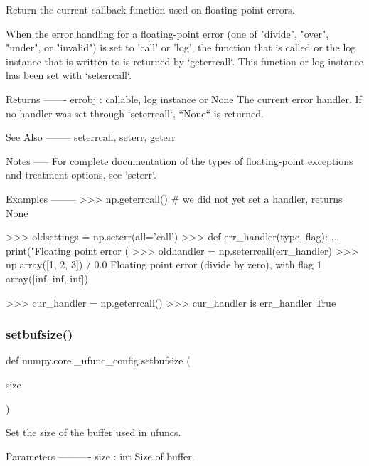 \begin{DoxyVerb}Return the current callback function used on floating-point errors.

When the error handling for a floating-point error (one of "divide",
"over", "under", or "invalid") is set to 'call' or 'log', the function
that is called or the log instance that is written to is returned by
`geterrcall`. This function or log instance has been set with
`seterrcall`.

Returns
-------
errobj : callable, log instance or None
    The current error handler. If no handler was set through `seterrcall`,
    ``None`` is returned.

See Also
--------
seterrcall, seterr, geterr

Notes
-----
For complete documentation of the types of floating-point exceptions and
treatment options, see `seterr`.

Examples
--------
>>> np.geterrcall()  # we did not yet set a handler, returns None

>>> oldsettings = np.seterr(all='call')
>>> def err_handler(type, flag):
...     print("Floating point error (%
>>> oldhandler = np.seterrcall(err_handler)
>>> np.array([1, 2, 3]) / 0.0
Floating point error (divide by zero), with flag 1
array([inf, inf, inf])

>>> cur_handler = np.geterrcall()
>>> cur_handler is err_handler
True\end{DoxyVerb}
 \mbox{\label{namespacenumpy_1_1core_1_1__ufunc__config_ad64972c5159efdca49ba505081ecb3e0}} 
\subsubsection{\texorpdfstring{setbufsize()}{setbufsize()}}
{\footnotesize\ttfamily def numpy.\+core.\+\_\+ufunc\+\_\+config.\+setbufsize (\begin{DoxyParamCaption}\item[{}]{size }\end{DoxyParamCaption})}

\begin{DoxyVerb}Set the size of the buffer used in ufuncs.

Parameters
----------
size : int
    Size of buffer.\end{DoxyVerb}
 \mbox{\label{namespacenumpy_1_1core_1_1__ufunc__config_a4918dbe1e60ec3a552e954dd018b77f1}} 
